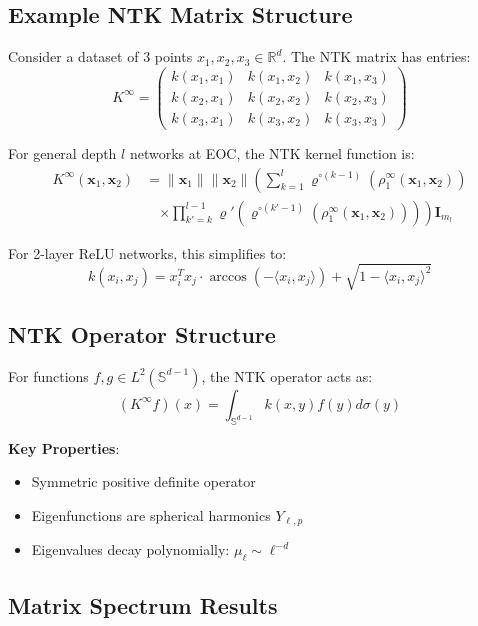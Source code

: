 \documentclass{article}
\begin{document}
\subsection{Example NTK Matrix Structure}

Consider a dataset of 3 points $x_1, x_2, x_3 \in \mathbb{R}^d$. The NTK matrix has entries:
\[
K^{\infty} = \begin{pmatrix} 
k(x_1,x_1) & k(x_1,x_2) & k(x_1,x_3) \\
k(x_2,x_1) & k(x_2,x_2) & k(x_2,x_3) \\
k(x_3,x_1) & k(x_3,x_2) & k(x_3,x_3)
\end{pmatrix}
\]

For general depth $l$ networks at EOC, the NTK kernel function is:
\begin{align}
K^{\infty}(\mathbf{x}_1, \mathbf{x}_2) &= \|\mathbf{x}_1\| \|\mathbf{x}_2\| \left( \sum_{k=1}^l \varrho^{\circ (k-1)}\left(\rho_1^{\infty}(\mathbf{x}_1, \mathbf{x}_2)\right) \right. \\
&\quad \left. \times \prod_{k'=k}^{l-1} \varrho'\left(\varrho^{\circ (k'-1)}\left(\rho_1^{\infty}(\mathbf{x}_1, \mathbf{x}_2)\right)\right) \right) \mathbf{I}_{m_l}
\end{align}

For 2-layer ReLU networks, this simplifies to:
\[
k(x_i,x_j) = x_i^T x_j \cdot \arccos(-\langle x_i,x_j \rangle) + \sqrt{1-\langle x_i,x_j \rangle^2}
\]

\subsection{NTK Operator Structure}

For functions $f,g \in L^2(\mathbb{S}^{d-1})$, the NTK operator acts as:
\[
(K^{\infty} f)(x) = \int_{\mathbb{S}^{d-1}} k(x,y)f(y)d\sigma(y)
\]

\textbf{Key Properties}:
\begin{itemize}
\item Symmetric positive definite operator
\item Eigenfunctions are spherical harmonics $Y_{\ell,p}$
\item Eigenvalues decay polynomially: $\mu_\ell \sim \ell^{-d}$
\end{itemize}

\subsection{Matrix Spectrum Results}
\end{document}
